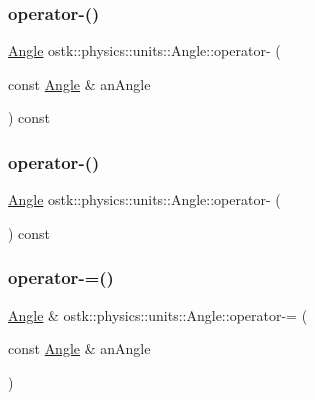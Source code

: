 \mbox{\label{classostk_1_1physics_1_1units_1_1_angle_adc4e27520c40a157d3cf868b1df07c1c}} 
\subsubsection{\texorpdfstring{operator-\/()}{operator-()}\hspace{0.1cm}{\footnotesize\ttfamily [1/2]}}
{\footnotesize\ttfamily \hyperlink{classostk_1_1physics_1_1units_1_1_angle}{Angle} ostk\+::physics\+::units\+::\+Angle\+::operator-\/ (\begin{DoxyParamCaption}\item[{const \hyperlink{classostk_1_1physics_1_1units_1_1_angle}{Angle} \&}]{an\+Angle }\end{DoxyParamCaption}) const}

\mbox{\label{classostk_1_1physics_1_1units_1_1_angle_aa1453072b55bf475b8953cf1dc5bdda3}} 
\subsubsection{\texorpdfstring{operator-\/()}{operator-()}\hspace{0.1cm}{\footnotesize\ttfamily [2/2]}}
{\footnotesize\ttfamily \hyperlink{classostk_1_1physics_1_1units_1_1_angle}{Angle} ostk\+::physics\+::units\+::\+Angle\+::operator-\/ (\begin{DoxyParamCaption}{ }\end{DoxyParamCaption}) const}

\mbox{\label{classostk_1_1physics_1_1units_1_1_angle_ac7699382075d4997670ed0071f8ba540}} 
\subsubsection{\texorpdfstring{operator-\/=()}{operator-=()}}
{\footnotesize\ttfamily \hyperlink{classostk_1_1physics_1_1units_1_1_angle}{Angle} \& ostk\+::physics\+::units\+::\+Angle\+::operator-\/= (\begin{DoxyParamCaption}\item[{const \hyperlink{classostk_1_1physics_1_1units_1_1_angle}{Angle} \&}]{an\+Angle }\end{DoxyParamCaption})}

